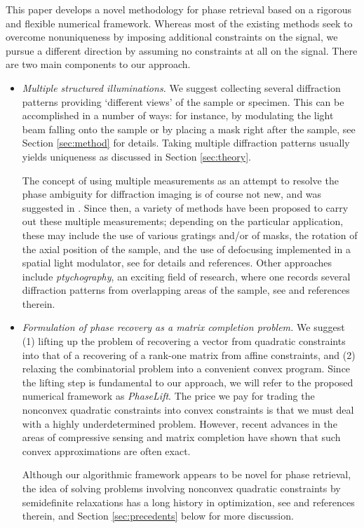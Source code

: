 \documentclass[11pt]{article}
\newcommand{\<}{\langle}
\renewcommand{\>}{\rangle}
\numberwithin{equation}{section}
\begin{document}
This paper develops a novel methodology for phase retrieval based on a
rigorous and flexible numerical framework.  Whereas most of the
existing methods seek to overcome nonuniqueness by imposing additional
constraints on the signal, we pursue a different direction by assuming
no constraints at all on the signal. There are two main components to
our approach.
\begin{itemize}
\item {\em Multiple structured illuminations.}  We suggest collecting
  several diffraction patterns providing `different views' of the
  sample or specimen. This can be accomplished in a number of ways:
  for instance, by modulating the light beam falling onto the sample
  or by placing a mask right after the sample, see Section
  \ref{sec:method} for details. Taking multiple diffraction patterns
  usually yields uniqueness as discussed in Section \ref{sec:theory}.

  The concept of using multiple measurements as an attempt to resolve
  the phase ambiguity for diffraction imaging is of course not new,
  and was suggested in \cite{Mis73}. Since then, a variety of methods
  have been proposed to carry out these multiple measurements;
  depending on the particular application, these may include the use
  of various gratings and/or of masks, the rotation of the axial
  position of the sample, and the use of defocusing implemented in a
  spatial light modulator, see \cite{Dua11} for details and
  references. Other approaches include {\em ptychography}, an exciting
  field of research, where one records several diffraction patterns
  from overlapping areas of the sample, see \cite{Rod08,TDB09} and
  references therein.

\item {\em Formulation of phase recovery as a matrix completion
    problem.} We suggest (1) lifting up the problem of recovering a
  vector from quadratic constraints into that of a recovering of a
  rank-one matrix from affine constraints, and (2) relaxing the
  combinatorial problem into a convenient convex program.  
Since the lifting step is fundamental to our approach, we will 
refer to the proposed numerical framework as {\em PhaseLift}.
  The price we pay for trading the nonconvex quadratic constraints into 
  convex constraints is that we must deal with a highly underdetermined
  problem. However, recent advances in the areas of compressive
  sensing and matrix completion have shown that such convex
  approximations are often exact. 


  Although our algorithmic framework appears to be novel for phase
  retrieval, the idea of solving problems involving nonconvex
  quadratic constraints by semidefinite relaxations has a long history
  in optimization, see \cite{BenTalNem} and references therein, and
  Section \ref{sec:precedents} below for more discussion.
\end{itemize}
\end{document}
